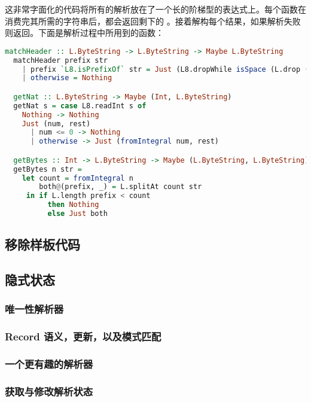 \documentclass[./main.tex]{subfiles}
\begin{document}
这非常字面化的代码将所有的解析放在了一个长的阶梯型的表达式上。每个函数在消费完其所需的字符串后，都会返回剩下的
。接着解构每个结果，如果解析失败则返回。下面是解析过程中所用到的函数：

\begin{lstlisting}[language=Haskell]
  matchHeader :: L.ByteString -> L.ByteString -> Maybe L.ByteString
  matchHeader prefix str
    | prefix `L8.isPrefixOf` str = Just (L8.dropWhile isSpace (L.drop (L.length prefix) str))
    | otherwise = Nothing

  getNat :: L.ByteString -> Maybe (Int, L.ByteString)
  getNat s = case L8.readInt s of
    Nothing -> Nothing
    Just (num, rest)
      | num <= 0 -> Nothing
      | otherwise -> Just (fromIntegral num, rest)

  getBytes :: Int -> L.ByteString -> Maybe (L.ByteString, L.ByteString)
  getBytes n str =
    let count = fromIntegral n
        both@(prefix, _) = L.splitAt count str
     in if L.length prefix < count
          then Nothing
          else Just both
\end{lstlisting}


\subsection*{移除样板代码}

\subsection*{隐式状态}

\subsubsection*{唯一性解析器}

\subsubsection*{Record 语义，更新，以及模式匹配}

\subsubsection*{一个更有趣的解析器}

\subsubsection*{获取与修改解析状态}
\end{document}
